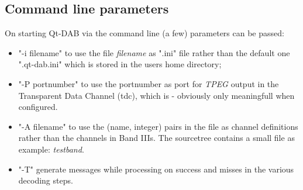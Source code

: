 \documentclass[12pt]{article}
\begin{document}
\subsection{Command line parameters}
On starting Qt-DAB via the command line (a few) parameters can be
passed:
\begin{itemize}
\item "-i filename" to use the file {\em filename} as ".ini" file rather than
the default one ".qt-dab.ini" which is stored in the users home directory;
\item "-P portnumber" to use the portnumber as port for {\em TPEG}
output in the Transparent Data Channel (tdc), which is - obviously
only meaningfull when configured.
\item "-A filename" to use the (name, integer) pairs in the file as channel definitions rather than the channels in Band IIIs. The sourcetree contains a
small file  as example: {\em testband}.
\item "-T" generate messages while processing on success and misses in the various decoding steps.
\end{itemize}
\end{document}
